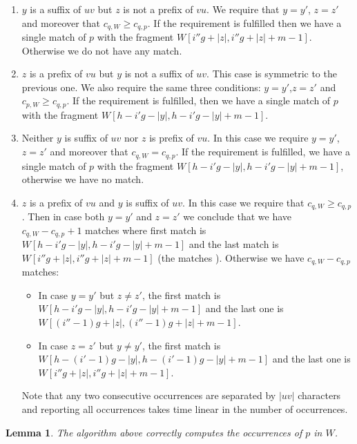 \documentclass{article}
\newcommand{\?}{\mskip1.5mu}
\newtheorem{lemma}{Lemma}
\begin{document}
\begin{enumerate}
\item $y$ is a suffix of $uv$ but $z$ is not a prefix of $vu$. We require that $y=y'$, $z=z'$ and moreover that $c_{q,W}\geq c_{q,p}$. If the requirement is fulfilled then we have a single match of $p$ with the fragment $W[i''g+|z|,i''g+|z|+m-1]$. Otherwise we do not have any match. 
\item $z$ is a prefix of $vu$ but $y$ is not a suffix of $uv$. This case is symmetric to the previous one. We also require the same three conditions: $y=y'$,$z=z'$ and $c_{p,W}\geq c_{q,p}$. If the requirement is fulfilled, then we have a single match of $p$ with the fragment $W[h-i'g-|y|,h-i'g-|y|+m-1]$.
\item Neither $y$ is suffix of $uv$ nor $z$ is prefix of $vu$. In this case we require $y=y'$, $z=z'$ and moreover that $c_{q,W}=c_{q,p}$. If the requirement is fulfilled, we have a single match of $p$ with the fragment $W[h-i'g-|y|,h-i'g-|y|+m-1]$, otherwise we have no match.
\item $z$ is a prefix of $vu$ and $y$ is suffix of $uv$. In this case we require that $c_{q,W}\geq c_{q,p}$. Then in case both $y=y'$ and $z=z'$ we conclude that we have $c_{q,W}-c_{q,p}+1$ matches where first match is $W[h-i'g-|y|,h-i'g-|y|+m-1]$ and the last match is $W[i''g+|z|,i''g+|z|+m-1]$ (the matches ). Otherwise we have $c_{q,W}-c_{q,p}$ matches:
\begin{itemize}
\item In case $y=y'$ but $z\neq z'$, the first match is $W[h-i'g-|y|,h-i'g-|y|+m-1]$ and the last one is $W[(i''-1)g+|z|,(i''-1)g+|z|+m-1]$.
\item In case $z=z'$ but $y\neq y'$, the first match is $W[h-(i'-1)g-|y|,h-(i'-1)g-|y|+m-1]$ and the last one is $W[i''g+|z|,i''g+|z|+m-1]$.
\end{itemize}
Note that any two consecutive occurrences are separated by $|uv|$ characters and reporting all occurrences takes time linear in the number of occurrences. 
\end{enumerate}
\begin{lemma}
The algorithm above correctly computes the occurrences of $p$ in $W$.
\end{lemma}
\end{document}
